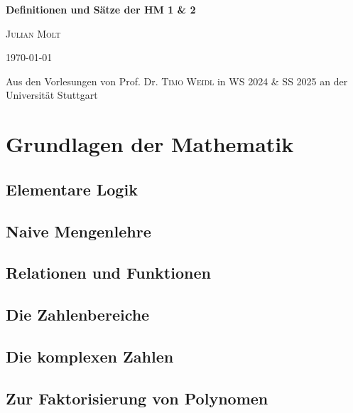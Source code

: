 \documentclass[11pt,a4paper]{report}
\begin{document}

\begin{titlepage}
	\centering
	\vspace*{4cm}
	{\sffamily \textbf{\Huge Definitionen und Sätze der HM 1 \& 2}\par}
	\vspace{1cm}
	{\huge \textsc{Julian Molt}\par}
	\vspace{1.5cm}
	{\Large \today\par}
	\vfill
	{\large Aus den Vorlesungen von Prof. Dr. \textsc{Timo Weidl} in WS 2024 \& SS 2025 an der Universität Stuttgart}
\end{titlepage}


\newpage%
\tableofcontents
\pagebreak

\chapter{Grundlagen der Mathematik}
\section{Elementare Logik}
\section{Naive Mengenlehre}
\section{Relationen und Funktionen}
\section{Die Zahlenbereiche}
\section{Die komplexen Zahlen}
\section{Zur Faktorisierung von Polynomen}

\end{document}
